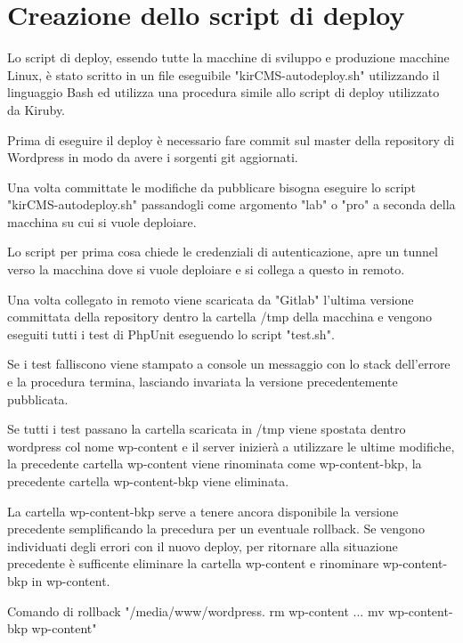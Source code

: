 \section{Creazione dello script di deploy}
Lo script di deploy, essendo tutte la macchine di sviluppo e produzione macchine Linux, è stato scritto in un file eseguibile
"kirCMS-autodeploy.sh" utilizzando il linguaggio Bash ed utilizza una procedura simile allo script di deploy 
utilizzato da Kiruby.

Prima di eseguire il deploy è necessario fare commit sul master della repository di Wordpress in modo da avere i sorgenti git aggiornati.

Una volta committate le modifiche da pubblicare bisogna eseguire lo script "kirCMS-autodeploy.sh" passandogli come argomento
"lab" o "pro" a seconda della macchina su cui si vuole deploiare.

Lo script per prima cosa chiede le credenziali di autenticazione, apre un tunnel verso la macchina dove si vuole deploiare e si collega a questo in remoto.

Una volta collegato in remoto viene scaricata da "Gitlab" l'ultima versione committata della repository dentro la cartella /tmp
della macchina e vengono eseguiti tutti i test di PhpUnit eseguendo lo script "test.sh".

Se i test falliscono viene stampato a console un messaggio con lo stack dell'errore e la procedura termina, lasciando invariata
la versione precedentemente pubblicata.

Se tutti i test passano la cartella scaricata in /tmp viene spostata dentro wordpress col nome wp-content e il server inizierà a
utilizzare le ultime modifiche, la precedente cartella wp-content viene rinominata come wp-content-bkp, la precedente cartella wp-content-bkp
viene eliminata.

La cartella wp-content-bkp serve a tenere ancora disponibile la versione precedente semplificando la precedura per un eventuale rollback. Se vengono individuati degli errori con il nuovo deploy, per ritornare alla situazione precedente è sufficente eliminare la cartella wp-content
e rinominare wp-content-bkp in wp-content.

Comando di rollback "/media/www/wordpress. rm wp-content ... mv wp-content-bkp wp-content"
